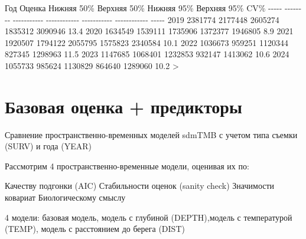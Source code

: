 \documentclass[
  letterpaper,
  DIV=11,
  numbers=noendperiod]{scrreprt}
\newenvironment{Shaded}{\begin{snugshade}}{\end{snugshade}}
\newcommand{\DecValTok}[1]{\textcolor[rgb]{0.68,0.00,0.00}{#1}}
\newcommand{\FloatTok}[1]{\textcolor[rgb]{0.68,0.00,0.00}{#1}}
\newcommand{\NormalTok}[1]{\textcolor[rgb]{0.00,0.23,0.31}{#1}}
\newcommand{\SpecialCharTok}[1]{\textcolor[rgb]{0.37,0.37,0.37}{#1}}
\begin{document}
\begin{Shaded}
\begin{Highlighting}[]
\NormalTok{  Год    Оценка   Нижняя }\DecValTok{50}\SpecialCharTok{\%   Верхняя 50\%}\NormalTok{   Нижняя }\DecValTok{95}\SpecialCharTok{\%   Верхняя 95\%}\NormalTok{    CV\%}
\SpecialCharTok{{-}{-}{-}{-}{-}}  \SpecialCharTok{{-}{-}{-}{-}{-}{-}{-}{-}}  \SpecialCharTok{{-}{-}{-}{-}{-}{-}{-}{-}{-}{-}{-}}  \SpecialCharTok{{-}{-}{-}{-}{-}{-}{-}{-}{-}{-}{-}{-}}  \SpecialCharTok{{-}{-}{-}{-}{-}{-}{-}{-}{-}{-}{-}}  \SpecialCharTok{{-}{-}{-}{-}{-}{-}{-}{-}{-}{-}{-}{-}}  \SpecialCharTok{{-}{-}{-}{-}{-}}
 \DecValTok{2019}   \DecValTok{2381774}      \DecValTok{2177448}       \DecValTok{2605274}      \DecValTok{1835312}       \DecValTok{3090946}   \FloatTok{13.4}
 \DecValTok{2020}   \DecValTok{1634549}      \DecValTok{1539111}       \DecValTok{1735906}      \DecValTok{1372377}       \DecValTok{1946805}    \FloatTok{8.9}
 \DecValTok{2021}   \DecValTok{1920507}      \DecValTok{1794122}       \DecValTok{2055795}      \DecValTok{1575823}       \DecValTok{2340584}   \FloatTok{10.1}
 \DecValTok{2022}   \DecValTok{1036673}       \DecValTok{959251}       \DecValTok{1120344}       \DecValTok{827345}       \DecValTok{1298963}   \FloatTok{11.5}
 \DecValTok{2023}   \DecValTok{1147685}      \DecValTok{1068401}       \DecValTok{1232853}       \DecValTok{932147}       \DecValTok{1413062}   \FloatTok{10.6}
 \DecValTok{2024}   \DecValTok{1055733}       \DecValTok{985624}       \DecValTok{1130829}       \DecValTok{864640}       \DecValTok{1289060}   \FloatTok{10.2}
\SpecialCharTok{\textgreater{}} 
\end{Highlighting}
\end{Shaded}

\section{Базовая оценка +
предикторы}\label{ux431ux430ux437ux43eux432ux430ux44f-ux43eux446ux435ux43dux43aux430-ux43fux440ux435ux434ux438ux43aux442ux43eux440ux44b}

Сравнение пространственно-временных моделей sdmTMB с учетом типа съемки
(SURV) и года (YEAR)

Рассмотрим 4 пространственно-временные модели, оценивая их по:

Качеству подгонки (AIC) Стабильности оценок (sanity check) Значимости
ковариат Биологическому смыслу

4 модели: базовая модель, модель с глубиной (DEPTH),модель с
температурой (TEMP), модель с расстоянием до берега (DIST)
\end{document}
